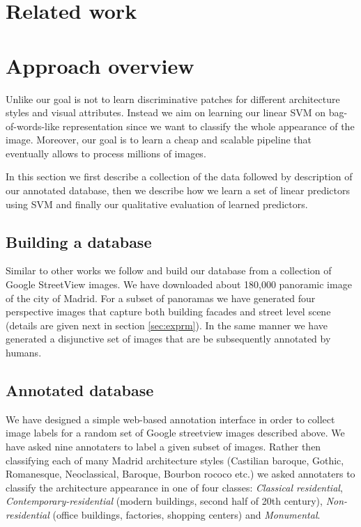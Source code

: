 \documentclass[runningheads, table]{llncs}
\begin{document}
\section{Related work}


\section{Approach overview}
Unlike \cite{Doersch} our goal is not to learn discriminative patches for different architecture styles and visual attributes. Instead we aim on learning our linear SVM on bag-of-words-like representation since we want to classify the whole appearance of the image. Moreover, our goal is to learn a cheap and scalable pipeline that eventually allows to process millions of images.

In this section we first describe a collection of the data followed by description of our annotated database, then we describe how we learn a set of linear predictors using SVM and finally our qualitative evaluation of learned predictors.

\subsection{Building a database}
  \vspace{-1mm}
  Similar to other works \cite{Gronat13, Doersch} we follow \cite{Gronat11} and build our database from a collection of Google StreetView images. We have downloaded about 180,000 panoramic image of the city of Madrid. For a subset of panoramas we have generated four perspective images that capture both building facades and street level scene (details are given next in section \ref{sec:exprm}). In the same manner we have generated a disjunctive set of images that are be subsequently annotated by humans. 
  
\subsection{Annotated database} 
  \vspace{-1mm}
  We have designed a simple web-based annotation interface in order to collect image labels for a random set of Google streetview images described above. We have asked nine annotaters to label a given subset of images. Rather then  classifying each of many Madrid architecture styles (Castilian baroque, Gothic, Romanesque, Neoclassical, Baroque, Bourbon rococo etc.) we asked annotaters to classify the architecture appearance in one of four classes: \emph{Classical residential}, \emph{Contemporary-residential} (modern buildings, second half of 20th century), \emph{Non-residential} (office buildings, factories, shopping centers) and \emph{Monumental}. 
\end{document}
